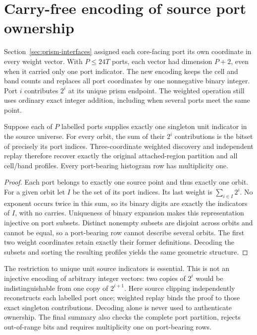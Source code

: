 \section{Carry-free encoding of source port ownership}
\label{sec:prism-port-encoding}

Section~\ref{sec:prism-interfaces} assigned each core-facing port its own
coordinate in every weight vector. With $P\le24T$ ports, each vector had
dimension $P+2$, even when it carried only one port indicator. The new
encoding keeps the cell and band counts and replaces all port coordinates
by one nonnegative binary integer. Port $i$ contributes $2^i$ at its
unique prism endpoint. The weighted operation still uses ordinary exact
integer addition, including when several ports meet the same point.

\begin{proposition}
Suppose each of $P$ labelled ports supplies exactly one singleton unit
indicator in the source universe. For every orbit, the sum of their
$2^i$ contributions is the bitset of precisely its port indices.
Three-coordinate weighted discovery and independent replay therefore
recover exactly the original attached-region partition and all cell/band
profiles. Every port-bearing histogram row has multiplicity one.
\end{proposition}
\begin{proof}
Each port belongs to exactly one source point and thus exactly one orbit.
For a given orbit let $I$ be the set of its port indices. Its last weight
is $\sum_{i\in I}2^i$. No exponent occurs twice in this sum, so its binary
digits are exactly the indicators of $I$, with no carries. Uniqueness of
binary expansion makes this representation injective on port subsets.
Distinct nonempty subsets are disjoint across orbits and cannot be equal,
so a port-bearing row cannot describe several orbits. The first two weight
coordinates retain exactly their former definitions. Decoding the subsets
and sorting the resulting profiles yields the same geometric structure.
\end{proof}

The restriction to unique unit source indicators is essential. This is
not an injective encoding of arbitrary integer vectors: two copies of
$2^i$ would be indistinguishable from one copy of $2^{i+1}$. Here source
clipping independently reconstructs each labelled port once; weighted
replay binds the proof to those exact singleton contributions. Decoding
alone is never used to authenticate ownership. The final summary also
checks the complete port partition, rejects out-of-range bits and requires
multiplicity one on port-bearing rows.

